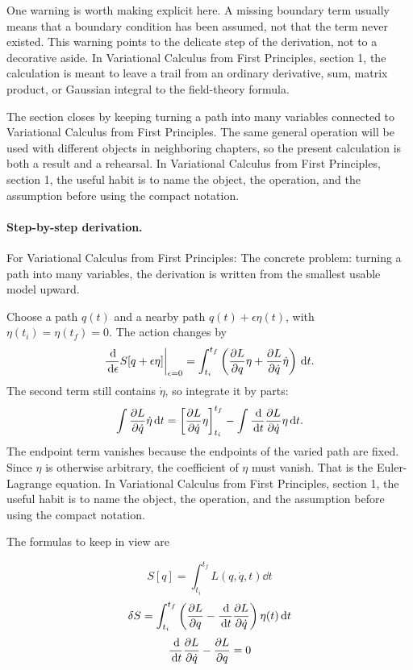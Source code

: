 One warning is worth making explicit here.  A missing boundary term usually means that a boundary condition has been assumed, not that the term never existed.  This warning points to the delicate step of the derivation, not to a decorative aside.  In Variational Calculus from First Principles, section 1, the calculation is meant to leave a trail from an ordinary derivative, sum, matrix product, or Gaussian integral to the field-theory formula.

The section closes by keeping turning a path into many variables connected to Variational Calculus from First Principles.  The same general operation will be used with different objects in neighboring chapters, so the present calculation is both a result and a rehearsal.  In Variational Calculus from First Principles, section 1, the useful habit is to name the object, the operation, and the assumption before using the compact notation.



\paragraph{Step-by-step derivation.}

For Variational Calculus from First Principles: The concrete problem: turning a path into many variables, the derivation is written from the smallest usable model upward.

Choose a path \(q(t)\) and a nearby path \(q(t)+\epsilon\eta(t)\), with \(\eta(t_i)=\eta(t_f)=0\).  The action changes by
\[
  \frac{\,\mathrm d}{\,\mathrm d\epsilon}S[q+\epsilon\eta]\bigg|_{\epsilon=0}
  =
  \int_{t_i}^{t_f}
  \left(
  \frac{\partial L}{\partial q}\eta+\frac{\partial L}{\partial\dot q}\dot\eta
  \right)\,\mathrm d t.
\]
The second term still contains \(\dot\eta\), so integrate it by parts:
\[
  \int \frac{\partial L}{\partial\dot q}\dot\eta\,\mathrm d t
  =
  \left[\frac{\partial L}{\partial\dot q}\eta\right]_{t_i}^{t_f}
  -
  \int \frac{\,\mathrm d}{\,\mathrm d t}\frac{\partial L}{\partial\dot q}\eta\,\mathrm d t.
\]
The endpoint term vanishes because the endpoints of the varied path are fixed.  Since \(\eta\) is otherwise arbitrary, the coefficient of \(\eta\) must vanish.  That is the Euler-Lagrange equation.  In Variational Calculus from First Principles, section 1, the useful habit is to name the object, the operation, and the assumption before using the compact notation.

The formulas to keep in view are

\[
  S[q]=\int_{t_i}^{t_f}L(q,\dot q,t)\dd t
\]
\[
  \delta S=\int_{t_i}^{t_f}\left(\frac{\partial L}{\partial q}-\frac{\,\mathrm d}{\,\mathrm d t}\frac{\partial L}{\partial\dot q}\right)\eta(t)\,\mathrm d t
\]
\[
  \frac{\,\mathrm d}{\,\mathrm d t}\frac{\partial L}{\partial\dot q}-\frac{\partial L}{\partial q}=0
\]

